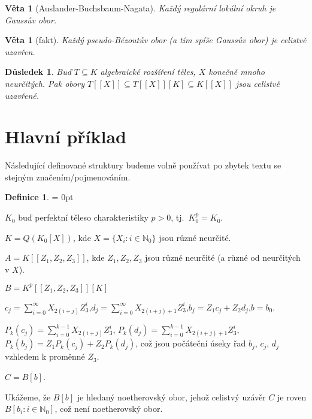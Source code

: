 \documentclass[11pt,a4paper]{article}
\newcommand\m[1]{\mathbb { #1 }} %
\newcommand\N{\m N}
\let \icl \overline %
\newenvironment{items}{%
	\itemize
	\itemsep = 0pt%
}{%
	\enditemize
}
\newcounter{numb}
\theoremstyle{definition}
\newtheorem*{definice}{Definice}
\theoremstyle{plain}
\newtheorem{veta}[numb]{Věta}
\newtheorem{dusledek}[numb]{Důsledek}
\begin{document}
\begin{veta}[Auslander-Buchsbaum-Nagata]
	Každý regulární lokální okruh je Gaussův obor.
\end{veta}

\begin{veta}[fakt]
	Každý pseudo-Bézoutův obor (a tím spíše Gaussův obor) je celistvě uzavřen.
\end{veta}

\begin{dusledek} \label{thm:icl}
	Buď $T \subseteq K$ algebraické rozšíření těles, $X$ konečně mnoho neurčitých. Pak obory $T[[X]] \subseteq T[[X]][K] \subseteq K[[X]]$ jsou celistvě uzavřené.
\end{dusledek}


\section{Hlavní příklad}

Následující definované struktury budeme volně používat po zbytek textu se stejným značením/pojmenováním.

\begin{definice} \hfill
	\newcommand*{\I}{_{i = 0}^\infty}
	\newcommand*{\PI}{_{i = 0}^{k - 1}}

	\begin{items}
		\item $K_0$ buď perfektní těleso charakteristiky $p > 0$, tj.\ $K_0^p = K_0$.
		\item $K = Q(K_0[X])$, kde $X = \{X_i: i \in \N_0\}$ jsou různé neurčité.
		\item $A = K[[Z_1, Z_2, Z_3]]$, kde $Z_1, Z_2, Z_3$ jsou různé neurčité (a různé od neurčitých v $X$).
		\item $B = K^p[[Z_1, Z_2, Z_3]][K]$
		\item $c_j = \sum\I X_{2(i + j)} Z_3^i$,\quad $d_j = \sum\I X_{2(i + j) + 1} Z_3^i$,\quad $b_j = Z_1 c_j + Z_2 d_j$,\quad $b = b_0$.
		\item $P_k(c_j) = \sum\PI X_{2(i + j)} Z_3^i$, $P_k(d_j) = \sum\PI X_{2(i + j) + 1} Z_3^i$, $P_k(b_j) = Z_1 P_k(c_j) + Z_2 P_k(d_j)$, což jsou počáteční úseky řad $b_j$, $c_j$, $d_j$ vzhledem k proměnné $Z_3$.
		\item $C = \icl{B[b]}$.
	\end{items}
\end{definice}
\newcommand{\Ball}{\ensuremath{B[b_i: i \in \N_0]}} %

Ukážeme, že $B[b]$ je hledaný noetherovský obor, jehož celistvý uzávěr $C$ je roven $B[b_i: i \in \N_0]$, což není noetherovský obor.
\end{document}
